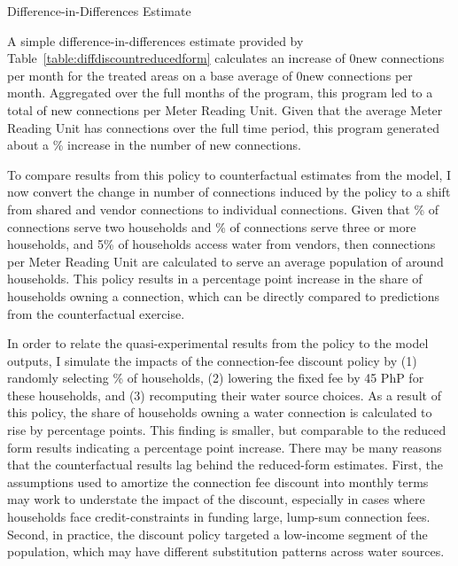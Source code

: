 \documentclass[12pt]{article}
\begin{document}
\begin{table}
\centering
\caption{Difference-in-Differences Estimate}\label{table:diffdiscountreducedform}

\end{table}

A simple difference-in-differences estimate provided by Table~\ref{table:diffdiscountreducedform} calculates an increase of 0new connections per month for the treated areas on a base average of 0new connections per month.  Aggregated over the full months of the program, this program led to a total of new connections per Meter Reading Unit.  Given that the average Meter Reading Unit has connections over the full time period, this program generated about a \unskip\% increase in the number of new connections.  

To compare results from this policy to counterfactual estimates from the model, I now convert the change in number of connections induced by the policy to a shift from shared and vendor connections to individual connections.  Given that \unskip\% of connections serve two households and \unskip\% of connections serve three or more households, and 5\% of households access water from vendors, then connections per Meter Reading Unit are calculated to serve an average population of around households.  This policy results in a percentage point increase in the share of households owning a connection, which can be directly compared to predictions from the counterfactual exercise.

In order to relate the quasi-experimental results from the policy to the model outputs, I simulate the impacts of the connection-fee discount policy by (1) randomly selecting \unskip\% of households, (2) lowering the fixed fee by 45 PhP for these households, and (3) recomputing their water source choices.  As a result of this policy, the share of households owning a water connection is calculated to rise by percentage points.  This finding is smaller, but comparable to the reduced form results indicating a percentage point increase.  There may be many reasons that the counterfactual results lag behind the reduced-form estimates.  First, the assumptions used to amortize the connection fee discount into monthly terms  may work to understate the impact of the discount, especially in cases where households face credit-constraints in funding large, lump-sum connection fees.  Second, in practice, the discount policy targeted a low-income segment of the population, which may have different substitution patterns across water sources.  
\end{document}
